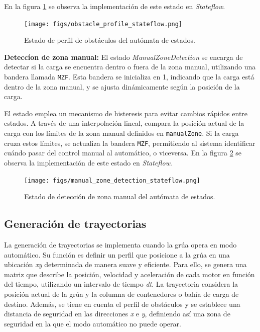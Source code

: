 \documentclass{article}
\begin{document}
            En la figura \ref{fig:obstacle_profile_stateflow} se observa la implementación de este estado en \textit{Stateflow}.

            \begin{figure} [H]
                \centering
                \texttt{[image: figs/obstacle\_profile\_stateflow.png]}
                \caption{Estado de perfil de obstáculos del autómata de estados.}
                \label{fig:obstacle_profile_stateflow}
            \end{figure}

        \textbf{Deteccíon de zona manual:}
            El estado \textit{ManualZoneDetection} se encarga de detectar si la carga se encuentra dentro o fuera de la zona manual, utilizando una bandera llamada \texttt{MZF}. Esta bandera se inicializa en 1, indicando que la carga está dentro de la zona manual, y se ajusta dinámicamente según la posición de la carga.

            El estado emplea un mecanismo de histeresis para evitar cambios rápidos entre estados. A través de una interpolación lineal, compara la posición actual de la carga con los límites de la zona manual definidos en \texttt{manualZone}. Si la carga cruza estos límites, se actualiza la bandera \texttt{MZF}, permitiendo al sistema identificar cuándo pasar del control manual al automático, o viceversa. En la figura \ref{fig:manual_zone_detection_stateflow} se observa la implementación de este estado en \textit{Stateflow}.
        
            \begin{figure} [H]
                \centering
                \texttt{[image: figs/manual\_zone\_detection\_stateflow.png]}
                \caption{Estado de detección de zona manual del autómata de estados.}
                \label{fig:manual_zone_detection_stateflow}
            \end{figure}


    


        \subsection{Generación de trayectorias} \label{sec:gen_trayectorias}

            La generación de trayectorias se implementa cuando la grúa opera en modo automático. Su función es definir un perfil que posicione a la grúa en una ubicación \textit{xy} determinada de manera suave y eficiente. Para ello, se genera una matriz que describe la posición, velocidad y aceleración de cada motor en función del tiempo, utilizando un intervalo de tiempo \textit{dt}. La trayectoria considera la posición actual de la grúa y la columna de contenedores o bahía de carga de destino. Además, se tiene en cuenta el perfil de obstáculos y se establece una distancia de seguridad en las direcciones \textit{x} e \textit{y}, definiendo así una zona de seguridad en la que el modo automático no puede operar.
\end{document}
